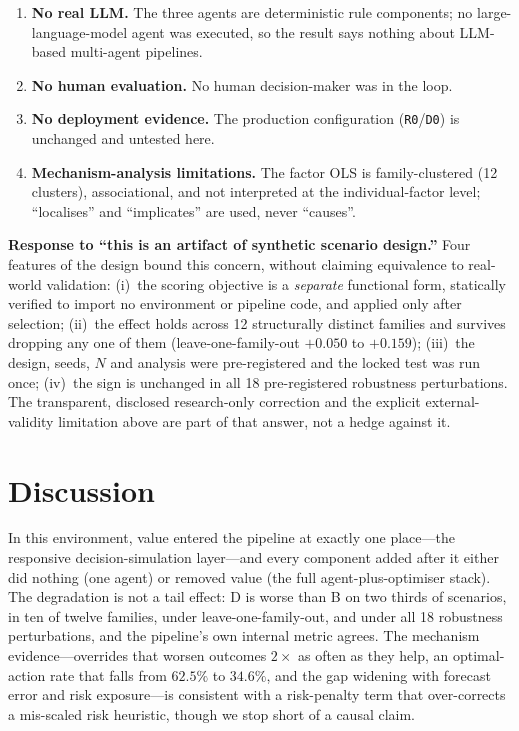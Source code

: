 \documentclass[10pt,twocolumn,a4paper]{article}
\newcommand{\code}[1]{\texttt{#1}}
\begin{document}
\begin{enumerate}
        estimate (median absolute error $0.084$ on development data; 0\% fallback
        on the locked run) and is biased mild in the two censored-demand
        families, which are exactly the families where D helps.
  \item \textbf{No real LLM.} The three agents are deterministic rule
        components; no large-language-model agent was executed, so the result
        says nothing about LLM-based multi-agent pipelines.
  \item \textbf{No human evaluation.} No human decision-maker was in the loop.
  \item \textbf{No deployment evidence.} The production configuration
        (\code{R0}/\code{D0}) is unchanged and untested here.
  \item \textbf{Mechanism-analysis limitations.} The factor OLS is
        family-clustered (12 clusters), associational, and not interpreted at the
        individual-factor level; ``localises'' and ``implicates'' are used, never
        ``causes''.
\end{enumerate}

\textbf{Response to ``this is an artifact of synthetic scenario design.''}
Four features of the design bound this concern, without claiming equivalence to
real-world validation: (i)~the scoring objective is a \emph{separate} functional
form, statically verified to import no environment or pipeline code, and applied
only after selection; (ii)~the effect holds across 12 structurally distinct
families and survives dropping any one of them (leave-one-family-out
$+0.050$ to $+0.159$); (iii)~the design, seeds, $N$ and analysis were
pre-registered and the locked test was run once; (iv)~the sign is unchanged in
all 18 pre-registered robustness perturbations. The transparent, disclosed
research-only correction and the explicit external-validity limitation above are
part of that answer, not a hedge against it.

\section{Discussion}\label{sec:disc}
In this environment, value entered the pipeline at exactly one place---the
responsive decision-simulation layer---and every component added after it either
did nothing (one agent) or removed value (the full agent-plus-optimiser stack).
The degradation is not a tail effect: D is worse than B on two thirds of
scenarios, in ten of twelve families, under leave-one-family-out, and under all
18 robustness perturbations, and the pipeline's own internal metric agrees. The
mechanism evidence---overrides that worsen outcomes $2\times$ as often as they
help, an optimal-action rate that falls from $62.5\%$ to $34.6\%$, and the gap
widening with forecast error and risk exposure---is consistent with a
risk-penalty term that over-corrects a mis-scaled risk heuristic, though we stop
short of a causal claim.
\end{document}
